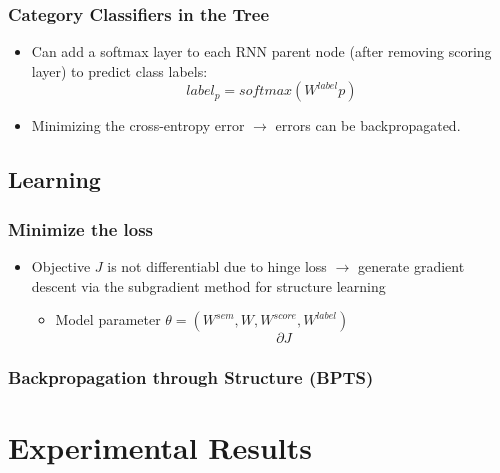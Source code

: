 \documentclass{beamer}
\begin{document}
\frame
{
	\frametitle{Category Classifiers in the Tree}
	\begin{itemize}
		\item Can add a softmax layer to each RNN parent node (after removing scoring layer) to predict class labels:
		$$ label_p = softmax(W^{label}p) $$ 
		\item Minimizing the cross-entropy error $\rightarrow$ errors can be backpropagated.
	\end{itemize}
}
\subsection{Learning}
\frame
{
	\frametitle{Minimize the loss}
	\begin{itemize}
		\item Objective $J$ is not differentiabl due to hinge loss $\rightarrow$
		generate gradient descent via the subgradient method for structure learning
		\begin{itemize}
			\item Model parameter $\theta = (W^{sem}, W, W^{score}, W^{label})$
			$$ \partial J $$
		\end{itemize}
	\end{itemize}
}
\frame
{
	\frametitle{Backpropagation through Structure (BPTS)}
}
\section{Experimental Results}
\end{document}
